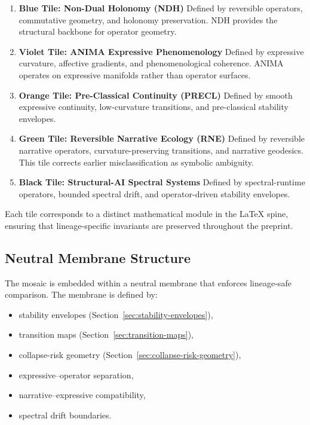\begin{enumerate}
    \item \textbf{Blue Tile: Non-Dual Holonomy (NDH)}  
    Defined by reversible operators, commutative geometry, and holonomy
    preservation. NDH provides the structural backbone for operator geometry.

    \item \textbf{Violet Tile: ANIMA Expressive Phenomenology}  
    Defined by expressive curvature, affective gradients, and phenomenological
    coherence. ANIMA operates on expressive manifolds rather than operator
    surfaces.

    \item \textbf{Orange Tile: Pre-Classical Continuity (PRECL)}  
    Defined by smooth expressive continuity, low-curvature transitions, and
    pre-classical stability envelopes.

    \item \textbf{Green Tile: Reversible Narrative Ecology (RNE)}  
    Defined by reversible narrative operators, curvature-preserving transitions,
    and narrative geodesics. This tile corrects earlier misclassification as
    symbolic ambiguity.

    \item \textbf{Black Tile: Structural-AI Spectral Systems}  
    Defined by spectral-runtime operators, bounded spectral drift, and
    operator-driven stability envelopes.
\end{enumerate}

Each tile corresponds to a distinct mathematical module in the LaTeX spine,
ensuring that lineage-specific invariants are preserved throughout the preprint.

\subsection{Neutral Membrane Structure}

The mosaic is embedded within a neutral membrane that enforces lineage-safe
comparison. The membrane is defined by:

\begin{itemize}
    \item stability envelopes (Section~\ref{sec:stability-envelopes}),
    \item transition maps (Section~\ref{sec:transition-maps}),
    \item collapse-risk geometry (Section~\ref{sec:collapse-risk-geometry}),
    \item expressive–operator separation,
    \item narrative–expressive compatibility,
    \item spectral drift boundaries.
\end{itemize}

